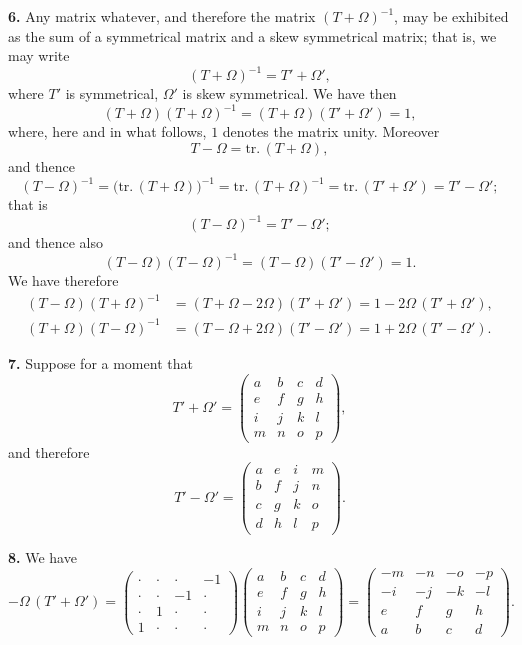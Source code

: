 \documentclass[11pt]{article}
\begin{document}
\textbf{6.} Any matrix whatever, and therefore the matrix $(T + \Omega)^{-1}$, may be exhibited as the sum of a symmetrical matrix and a skew symmetrical matrix; that is, we may write
\[
(T + \Omega)^{-1} = T' + \Omega',
\]
where $T'$ is symmetrical, $\Omega'$ is skew symmetrical. We have then
\[
(T + \Omega)(T + \Omega)^{-1} = (T + \Omega)(T' + \Omega') = 1,
\]
where, here and in what follows, $1$ denotes the matrix unity. Moreover
\[
T - \Omega = \mathrm{tr.}\,(T + \Omega),
\]
and thence
\[
(T - \Omega)^{-1} = \bigl(\mathrm{tr.}\,(T + \Omega)\bigr)^{-1} = \mathrm{tr.}\,(T + \Omega)^{-1} = \mathrm{tr.}\,(T' + \Omega') = T' - \Omega';
\]
that is
\[
(T - \Omega)^{-1} = T' - \Omega';
\]
and thence also
\[
(T - \Omega)(T - \Omega)^{-1} = (T - \Omega)(T' - \Omega') = 1.
\]
We have therefore
\begin{align*}
(T - \Omega)(T + \Omega)^{-1} &= (T + \Omega - 2\Omega)(T' + \Omega') = 1 - 2\Omega\,(T' + \Omega'), \\
(T + \Omega)(T - \Omega)^{-1} &= (T - \Omega + 2\Omega)(T' - \Omega') = 1 + 2\Omega\,(T' - \Omega').
\end{align*}

\textbf{7.} Suppose for a moment that
\[
T' + \Omega' = \begin{pmatrix} a & b & c & d \\ e & f & g & h \\ i & j & k & l \\ m & n & o & p \end{pmatrix},
\]
and therefore
\[
T' - \Omega' = \begin{pmatrix} a & e & i & m \\ b & f & j & n \\ c & g & k & o \\ d & h & l & p \end{pmatrix}.
\]

\textbf{8.} We have
\[
- \Omega\,(T' + \Omega') = \begin{pmatrix} \cdot & \cdot & \cdot & -1 \\ \cdot & \cdot & -1 & \cdot \\ \cdot & 1 & \cdot & \cdot \\ 1 & \cdot & \cdot & \cdot \end{pmatrix}
\begin{pmatrix} a & b & c & d \\ e & f & g & h \\ i & j & k & l \\ m & n & o & p \end{pmatrix}
= \begin{pmatrix} -m & -n & -o & -p \\ -i & -j & -k & -l \\ e & f & g & h \\ a & b & c & d \end{pmatrix}.
\]
\end{document}
